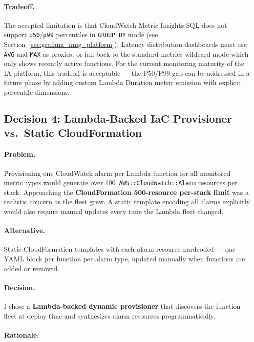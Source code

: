\paragraph{Tradeoff.}
The accepted limitation is that CloudWatch Metric Insights SQL does not
support \texttt{p50}/\texttt{p99} percentiles in \texttt{GROUP BY} mode
(see Section~\ref{sec:grafana_amg_platform}). Latency distribution
dashboards must use \texttt{AVG} and \texttt{MAX} as proxies, or fall
back to the standard metrics wildcard mode which only shows recently
active functions. For the current monitoring maturity of the IA platform,
this tradeoff is acceptable --- the P50/P99 gap can be addressed in a
future phase by adding custom Lambda Duration metric emission with
explicit percentile dimensions.

\subsection{Decision 4: Lambda-Backed IaC Provisioner vs.\ Static CloudFormation}
\label{sec:decision_lambda_provisioner}

\paragraph{Problem.}
Provisioning one CloudWatch alarm per Lambda function for all monitored
metric types would generate over 100~\texttt{AWS::CloudWatch::Alarm}
resources per stack. Approaching the \textbf{CloudFormation 500-resource
per-stack limit} was a realistic concern as the fleet grew. A static
template encoding all alarms explicitly would also require manual
updates every time the Lambda fleet changed.

\paragraph{Alternative.}
Static CloudFormation templates with each alarm resource hardcoded ---
one YAML block per function per alarm type, updated manually when
functions are added or removed.

\paragraph{Decision.}
I chose a \textbf{Lambda-backed dynamic provisioner} that discovers the function
fleet at deploy time and synthesizes alarm resources programmatically.

\paragraph{Rationale.}


